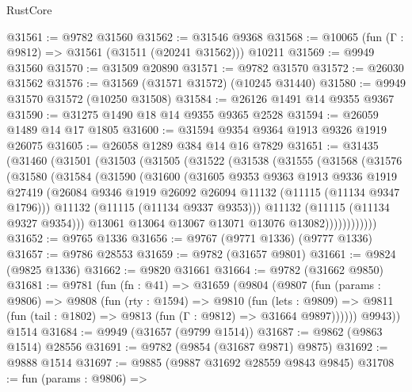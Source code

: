 \begin{lexlean}{RustCore}
\begin{coremodule}
@31561 := @9782 @31560
@31562 := @31546 @9368
@31568 := @10065 (fun (Γ : @9812) => @31561 (@31511 (@20241 @31562))) @10211
@31569 := @9949 @31560
@31570 := @31509 @20890
@31571 := @9782 @31570
@31572 := @26030 @31562
@31576 := @31569 (@31571 @31572) (@10245 @31440)
@31580 := @9949 @31570 @31572 (@10250 @31508)
@31584 := @26126 @1491 @14 @9355 @9367
@31590 := @31275 @1490 @18 @14 @9355 @9365 @2528
@31594 := @26059 @1489 @14 @17 @1805
@31600 := @31594 @9354 @9364 @1913 @9326 @1919 @26075
@31605 := @26058 @1289 @384 @14 @16 @7829
@31651 := @31435
    (@31460
      (@31501
        (@31503
          (@31505
            (@31522
              (@31538
                (@31555
                  (@31568
                    (@31576
                      (@31580
                        (@31584
                          (@31590
                            (@31600
                              (@31605
                                @9353
                                @9363
                                @1913
                                @9336
                                @1919
                                @27419
                                (@26084
                                  @9346
                                  @1919
                                  @26092
                                  @26094
                                  @11132
                                  (@11115 (@11134 @9347 @1796)))
                                @11132
                                (@11115 (@11134 @9337 @9353)))
                              @11132
                              (@11115 (@11134 @9327 @9354)))
                            @13061
                            @13064
                            @13067
                            @13071
                            @13076
                            @13082))))))))))))
@31652 := @9765 @1336
@31656 := @9767 (@9771 @1336) (@9777 @1336)
@31657 := @9786 @28553
@31659 := @9782 (@31657 @9801)
@31661 := @9824 (@9825 @1336)
@31662 := @9820 @31661
@31664 := @9782 (@31662 @9850)
@31681 := @9781
    (fun (fn : @41) =>
    @31659
      (@9804
        (@9807
          (fun (params : @9806) =>
          @9808
            (fun (rty : @1594) =>
            @9810
              (fun (lets : @9809) =>
              @9811 (fun (tail : @1802) => @9813 (fun (Γ : @9812) => @31664 @9897))))))
        @9943))
    @1514
@31684 := @9949 (@31657 (@9799 @1514))
@31687 := @9862 (@9863 @1514) @28556
@31691 := @9782 (@9854 (@31687 @9871) @9875)
@31692 := @9888 @1514
@31697 := @9885 (@9887 @31692 @28559 @9843 @9845)
@31708 := fun (params : @9806) =>

\end{coremodule}
\end{lexlean}
